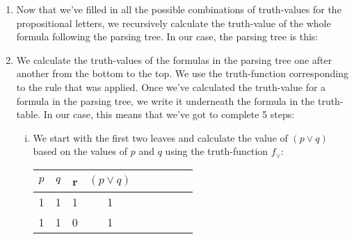 \begin{enumerate}[\thesection.1]
\begin{enumerate}
\begin{enumerate}[(i)]
\begin{center}
\begin{tabular}{c | c | c | c}
\end{tabular}
\end{center}

If you have more than 3 propositional letters, you can continue dividing the parts in two. This will always work, since half of half of $2^n$ will always be even.\footnote{If you know how to count in binary, then you can see that I'm basically counting down from $2^n$ in binary.}

\end{enumerate}

\item Now that we've filled in all the possible combinations of truth-values for the propositional letters, we recursively calculate the truth-value of the whole formula following the parsing tree. In our case, the parsing tree is this:

\begin{center}
\end{center}

\item We calculate the truth-values of the formulas in the parsing tree one after another from the bottom to the top. We use the truth-function corresponding to the rule that was applied. Once we've calculated the truth-value for a formula in the parsing tree, we write it underneath the formula in the truth-table. In our case, this means that we've got to complete 5 steps:

\begin{enumerate}[(i)]

\item We start with the first two leaves and calculate the value of $(p\lor q)$ based on the values of $p$ and $q$ using the truth-function $f_\lor$:


\begin{center}
\begin{tabular}{c c c | c | c  c  c  c  c}
$p$ & $q$  & r & $(p\lor q)$ & \hspace*{20ex}\\\hline

1 & 1 & 1 & 1 & &&&& \\

1 & 1 & 0 & 1 & &&&&  \\


\end{tabular}
\end{center}
\end{enumerate}
\end{enumerate}
\end{enumerate}
